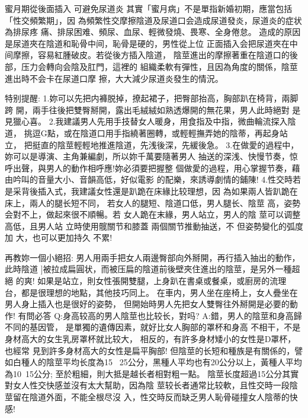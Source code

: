 \documentclass[12pt,UTF8]{ctexbook}
\begin{document}
蜜月期從後面插入
可避免尿道炎
其實「蜜月病」不是單指新婚初期，應當包括「性交頻繁期」，因
為頻繁性交摩擦陰道及尿道口会造成尿道發炎，尿道炎的症状為排尿疼
痛、排尿困难、頻尿、血尿、輕微發燒、畏寒、全身倦怠。
造成的原因是尿道夾在陰道和恥骨中间，恥骨是硬的，男性從上位
正面插入会把尿道夾在中间摩擦，容易紅腫破皮。若從後方插入陰道，
陰莖進出的摩擦著重在陰道口的後部，压力会轉向会陰及肛門，這裡的
組織柔軟有彈性，且因為角度的關係，陰莖進出時不会卡在尿道口摩
擦，大大減少尿道炎發生的情況。

特别提醒:
1.妳可以先把内褲脱掉，撩起裙子，把臀部抬高，胸部趴在椅背，兩脚跨
開，兩手往後把雙臀掰開，露出毛絨絨如熟透爆開的無花果，男人此時絕對
是見獵心喜。
2.我建議男人先用手技替女人暖身，用食指及中指，微曲輪流探入陰道，
挑逗G點，或在陰道口用手指繞著圈轉，或輕輕撫弄她的陰蒂，再起身站立，
把挺直的陰莖輕輕地推進陰道，先浅後深，先緩後急。
3.在做愛的過程中，妳可以是導演、主角兼編劇，所以妳千萬要隨著男人
抽送的深浅、快慢节奏，惊呼出聲，與男人的動作相呼應!妳必須要把握整
個做愛的過程，用心掌握节奏，藉由吟叫的音量大小、音韻高低，好似電影
的配樂，來誘導劇情的鋪陳!
4.性交時若是采背後插入式，我建議女性還是趴跪在床緣比较理想，因
為如果兩人皆趴跪在床上，兩人的腿长短不同，
若女人的腿短、陰道口低，男人腿长、陰莖
高，姿勢会對不上，做起來很不順暢。若
女人跪在末緣，男人站立，男人的陰
莖可以调整高低，且男人站
立時使用髋關节和膝蓋
兩個關节推動抽送，不
但姿勢變化的弧度加
大，也可以更加持久
不累!

再教妳一個小絕招:
男人用兩手把女人兩邊臀部向外掰開，再行插入抽出的動作，此時陰道
]被拉成扁圓状，而被压扁的陰道前後壁夾住進出的陰莖，是另外一種超絕
的爽!
如果是站立，則女性張開雙腿，上身趴在書桌或餐桌，或廚房的流理
台，都是很理想的地點，其他技巧同上。
在車内，男人坐在座椅上，女人疊坐在男人身上插入也是很好的姿勢，
但開始時男人先把女人雙臀往外掰開是必要的動作!
有問必答
Q:身高较高的男人陰莖也比较长，對吗?
A:錯，男人的陰莖和身高歸不同的基因管，
是單獨的遺傳因素，就好比女人胸部的罩杯和身高
不相干，不是身材高大的女生乳房罩杯就比较大，
相反的，有許多身材矮小的女性是D罩杯，也經常
見到許多身材高大的女性是扁平胸部!
但陰莖的长短和種族是有關係的，譬如白種人的陰莖平均长度為15
~25公分，黑種人平均也有20公分以上，黃種人平均為10~15公分;
至於粗細，則大抵是越长者相對粗一點。
陰莖长度超過15公分其實對女人性交快感並沒有太大幫助，因為陰
莖较长者通常比较軟，且性交時一段陰莖留在陰道外面，不能全根尽沒
入，性交時反而缺乏男人恥骨碰撞女人陰蒂的快感!
\end{document}
